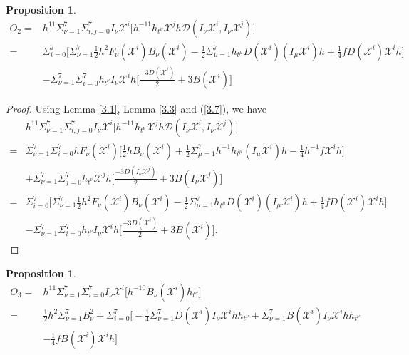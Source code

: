\documentclass[10pt,a4paper]{amsart}
\numberwithin{equation}{section}
\newtheorem{proposition}[theorem]{Proposition}
\begin{document}
\begin{proposition}
    \begin{equation}\label{3.18}
    \begin{aligned}
O_2=&h^{11}\Sigma_{\nu=1}^7\Sigma_{i,j=0}^7I_\nu \mathscr{X}^i\bigg[h^{-11}h_{t^\nu}\mathscr{X}^j h\mathcal{D}(I_\nu \mathscr{X}^i,I_\nu \mathscr{X}^j)\bigg]\\=&\Sigma_{i=0}^7\bigg[\Sigma_{\nu=1}^7\frac{1}{2}h^2F_\nu(\mathscr{X}^i)B_\nu (\mathscr{X}^i)-\frac{1}{2}\Sigma_{\mu=1}^7h_{t^\mu} D(\mathscr{X}^i) (I_\mu\mathscr{X}^i)h +\frac{1}{4}fD(\mathscr{X}^i)\mathscr{X}^i h \bigg]\\&
-\Sigma_{\nu=1}^7\Sigma_{i=0}^7h_{t^\nu}I_\nu\mathscr{X}^i h\bigg[\frac{-3D( \mathscr{X}^i)}{2}+3B(\mathscr{X}^i)\bigg]\end{aligned}
    \end{equation}
\end{proposition}
\begin{proof}
Using Lemma \ref{3.1}, Lemma \ref{3.3} and (\ref{3.7}), we have
     \begin{align*}
&h^{11}\Sigma_{\nu=1}^7\Sigma_{i,j=0}^7I_\nu \mathscr{X}^i\bigg[h^{-11}h_{t^\nu}\mathscr{X}^j h\mathcal{D}(I_\nu \mathscr{X}^i,I_\nu \mathscr{X}^j)\bigg]\\=&\Sigma_{\nu=1}^7\Sigma_{i=0}^7hF_\nu(\mathscr{X}^i) \bigg[\frac{1}{2} h B_\nu (\mathscr{X}^i)+\frac{1}{2}\Sigma_{\mu=1}^7 h^{-1}h_{t^\mu} (I_\mu\mathscr{X}^i)h -\frac{1}{4}h^{-1}f\mathscr{X}^i h \bigg]\\&+\Sigma_{\nu=1}^7\Sigma_{j=0}^7h_{t^\nu}\mathscr{X}^j h\bigg[\frac{-3D(I_\nu \mathscr{X}^j)}{2}+3B(I_\nu\mathscr{X}^j)\bigg] \\=&\Sigma_{i=0}^7\bigg[\Sigma_{\nu=1}^7\frac{1}{2}h^2F_\nu(\mathscr{X}^i)B_\nu (\mathscr{X}^i)-\frac{1}{2}\Sigma_{\mu=1}^7 h_{t^\mu}D(\mathscr{X}^i) (I_\mu\mathscr{X}^i)h +\frac{1}{4}fD(\mathscr{X}^i)\mathscr{X}^i h \bigg]\\&
-\Sigma_{\nu=1}^7\Sigma_{i=0}^7h_{t^\nu}I_\nu\mathscr{X}^i h\bigg[\frac{-3D( \mathscr{X}^i)}{2}+3B(\mathscr{X}^i)\bigg]. 
\end{align*}




\end{proof}






\begin{proposition}
\begin{equation}\label{3.19}
    \begin{aligned}
       O_3=& h^{11}\Sigma_{\nu=1}^7\Sigma_{i=0}^7I_\nu\mathscr{X}^i \bigg[h^{-10}B_\nu(\mathscr{X}^i)h_{t^\nu}\bigg]   \\=&\frac{1}{2}h^2\Sigma_{\nu=1}^7B_\nu^2 +\Sigma_{i=0}^7\bigg[-\frac{1}{4}\Sigma
_{\nu=1}^7D(\mathscr{X}^i)I_\nu\mathscr{X}^i h h_{t^\nu}+\Sigma_{\nu=1}^7B(\mathscr{X}^i)I_\nu{\mathscr{X}^i}hh_{t^\nu}\\&-\frac{1}{4}fB(\mathscr{X}^i)\mathscr{X}^i h\bigg]
       \end{aligned} 
       \end{equation}\end{proposition}
    
\end{document}
